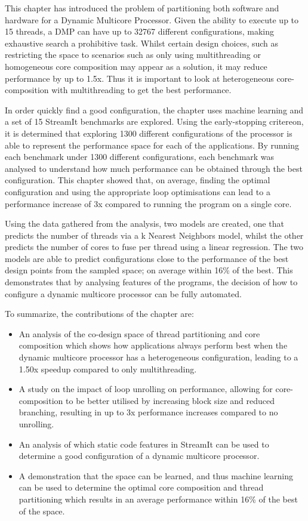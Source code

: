 This chapter has introduced the problem of partitioning both software and hardware for a Dynamic Multicore Processor.
Given the ability to execute up to 15 threads, a DMP can have up to 32767 different configurations, making exhaustive search a prohibitive task.
Whilst certain design choices, such as restricting the space to scenarios such as only using multithreading or homogeneous core composition may appear as a solution, it may reduce performance by up to 1.5x.
Thus it is important to look at heterogeneous core-composition with multithreading to get the best performance.

In order quickly find a good configuration, the chapter uses machine learning and a set of 15 StreamIt benchmarks are explored.
Using the early-stopping critereon, it is determined that exploring 1300 different configurations of the processor is able to represent the performance space for each of the applications.
By running each benchmark under 1300 different configurations, each benchmark was analysed to understand how much performance can be obtained through the best configuration.
This chapter showed that, on average, finding the optimal configuration and using the appropriate loop optimisations can lead to a performance increase of 3x compared to running the program on a single core.

Using the data gathered from the analysis, two models are created, one that predicts the number of threads via a k Nearest Neighbors model, whilst the other predicts the number of cores to fuse per thread using a linear regression.
The two models are able to predict configurations close to the performance of the best design points from the sampled space; on average within 16\% of the best.
This demonstrates that by analysing features of the programs, the decision of how to configure a dynamic multicore processor can be fully automated.

To summarize, the contributions of the chapter are:
\begin{itemize}
\item An analysis of the co-design space of thread partitioning and core composition which shows how applications always perform best when the dynamic multicore processor has a heterogeneous configuration, leading to a 1.50x speedup compared to only multithreading.
\vspace{-0.5em}
\item A study on the impact of loop unrolling on performance, allowing for core-composition to be better utilised by increasing block size and reduced branching, resulting in up to 3x performance increases compared to no unrolling.
\vspace{-0.5em}
\item An analysis of which static code features in StreamIt can be used to determine a good configuration of a dynamic multicore processor.
\vspace{-0.5em}
\item A demonstration that the space can be learned, and thus machine learning can be used to determine the optimal core composition and thread partitioning which results in an average performance within 16\% of the best of the space.
\end{itemize}
